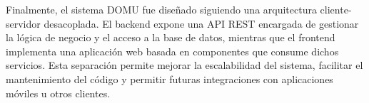 Finalmente, el sistema DOMU fue diseñado siguiendo una arquitectura cliente-servidor desacoplada. El backend expone una API REST encargada de gestionar la lógica de negocio y el acceso a la base de datos, mientras que el frontend implementa una aplicación web basada en componentes que consume dichos servicios. 
Esta separación permite mejorar la escalabilidad del sistema, facilitar el mantenimiento del código y permitir futuras integraciones con aplicaciones móviles u otros clientes.

